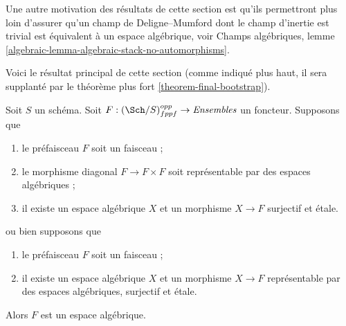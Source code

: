 \medskip\noindent
Une autre motivation des résultats de cette section est qu'ils permettront
plus loin d'assurer qu'un champ de Deligne--Mumford dont le champ d'inertie est
trivial est équivalent à un espace algébrique, voir
Champs algébriques, lemme \ref{algebraic-lemma-algebraic-stack-no-automorphisms}.

\medskip\noindent
Voici le résultat principal de cette section (comme indiqué plus haut, il
sera supplanté par le théorème plus fort
\ref{theorem-final-bootstrap}).

\begin{theorem}
\label{theorem-bootstrap}
Soit $S$ un schéma.
Soit $F : (\Sch/S)_{fppf}^{opp} \to \textit{Ensembles}$ un foncteur.
Supposons que
\begin{enumerate}
\item le préfaisceau $F$ soit un faisceau ;
\item le morphisme diagonal $F  \to F \times F$ soit représentable par
des espaces algébriques ;
\item il existe un espace algébrique $X$
et un morphisme $X \to F$ surjectif et étale.
\end{enumerate}
ou bien supposons que
\begin{enumerate}
\item[(a)] le préfaisceau $F$ soit un faisceau ;
\item[(b)] il existe un espace algébrique $X$ et un morphisme $X \to F$
représentable par des espaces algébriques, surjectif et étale.
\end{enumerate}
Alors $F$ est un espace algébrique.
\end{theorem}

